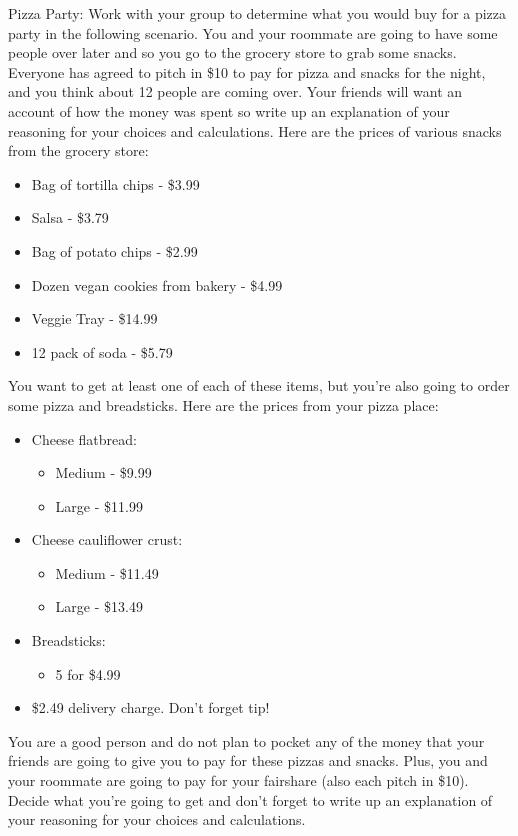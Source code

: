 \documentclass{ximera}
\begin{document}
\begin{exploration} Pizza Party: 
Work with your group to determine what you would buy for a pizza party in the following scenario.  
You and your roommate are going to have some people over later and so you go to the grocery store to grab some snacks.  Everyone has agreed to pitch in \$10 to pay for pizza and snacks for the night, and you think about 12 people are coming over. Your friends will want an account of how the money was spent so write up an explanation of your reasoning for your choices and calculations.
Here are the prices of various snacks from the grocery store: 
\begin{itemize}
\item Bag of tortilla chips - \$3.99 
\item Salsa - \$3.79
\item Bag of potato chips - \$2.99 
\item Dozen vegan cookies from bakery - \$4.99 
\item Veggie Tray - \$14.99 
\item 12 pack of soda - \$5.79 
\end{itemize}
You want to get at least one of each of these items, but you're also going to order some pizza and breadsticks. 
Here are the prices from your pizza place: 
\begin{itemize}
    \item Cheese flatbread: 
    \begin{itemize}
        \item Medium - \$9.99 
        \item Large - \$11.99 
    \end{itemize}
    \item Cheese cauliflower crust: 
    \begin{itemize}
        \item Medium - \$11.49 
        \item Large - \$13.49 
    \end{itemize}
    \item Breadsticks: 
    \begin{itemize}
        \item 5 for \$4.99 
    \end{itemize}
    \item \$2.49 delivery charge.  Don't forget tip! 
\end{itemize}
You are a good person and do not plan to pocket any of the money that your friends are going to give you to pay for these pizzas and snacks.  Plus, you and your roommate are going to pay for your fairshare (also each pitch in \$10).  Decide what you're going to get and don't forget to write up an explanation of your reasoning for your choices and calculations.
\end{exploration}
\end{document}
